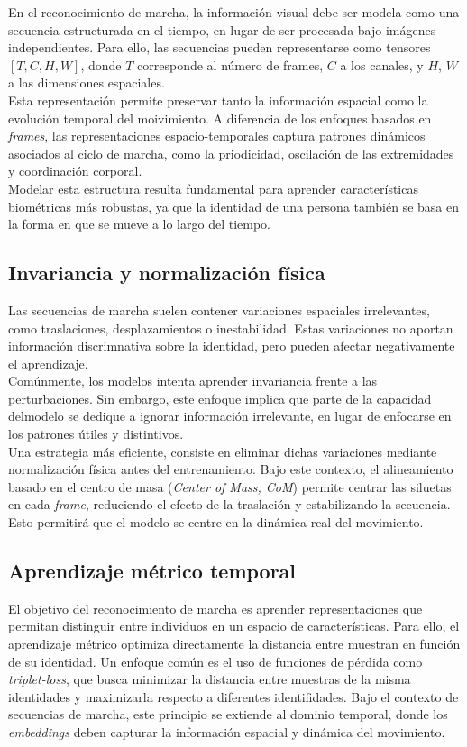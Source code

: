 En el reconocimiento de marcha, la información visual debe ser modela como una secuencia estructurada en el tiempo, en lugar de ser procesada bajo imágenes independientes. Para ello, las secuencias pueden representarse como tensores $[T, C, H, W]$, donde $T$ corresponde al número de frames, $C$ a los canales, y $H$, $W$ a las dimensiones espaciales. \\
Esta representación permite preservar tanto la información espacial como la evolución temporal del moivimiento. A diferencia de los enfoques basados en \textit{frames}, las representaciones espacio-temporales captura patrones dinámicos asociados al ciclo de marcha, como la priodicidad, oscilación de las extremidades y coordinación corporal. \\
Modelar esta estructura resulta fundamental para aprender características biométricas más robustas, ya que la identidad de una persona también se basa en la forma en que se mueve a lo largo del tiempo.

\subsection{Invariancia y normalización física}

Las secuencias de marcha suelen contener variaciones espaciales irrelevantes, como traslaciones, desplazamientos o inestabilidad. Estas variaciones no aportan información discrimnativa sobre la identidad, pero pueden afectar negativamente el aprendizaje. \\
Comúnmente, los modelos intenta aprender invariancia frente a las perturbaciones. Sin embargo, este enfoque implica que parte de la capacidad delmodelo se dedique a ignorar información irrelevante, en lugar de enfocarse en los patrones útiles y distintivos. \\
Una estrategia más eficiente, consiste en eliminar dichas variaciones mediante normalización física antes del entrenamiento. Bajo este contexto, el alineamiento basado en el centro de masa (\textit{Center of Mass, CoM}) permite centrar las siluetas en cada \textit{frame}, reduciendo el efecto de la traslación y estabilizando la secuencia. Esto permitirá que el modelo se centre en la dinámica real del movimiento.

\subsection{Aprendizaje métrico temporal}

El objetivo del reconocimiento de marcha es aprender representaciones que permitan distinguir entre individuos en un espacio de características. Para ello, el aprendizaje métrico optimiza directamente la distancia entre muestran en función de su identidad. Un enfoque común es el uso de funciones de pérdida como \textit{triplet-loss}, que busca minimizar la distancia entre muestras de la misma identidades y maximizarla respecto a diferentes identifidades. Bajo el contexto de secuencias de marcha, este principio se extiende al dominio temporal, donde los \textit{embeddings} deben capturar la información espacial y dinámica del movimiento.

